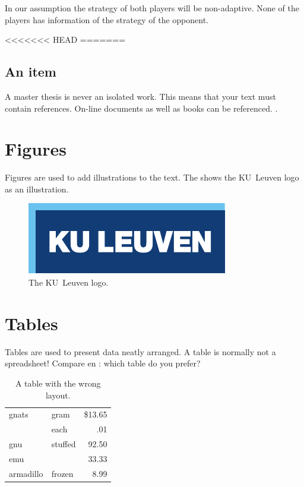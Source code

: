 In our assumption the strategy of both players will be non-adaptive. None of the players has information of the strategy of the opponent. 


<<<<<<< HEAD
=======
\subsection{An item}
A master thesis is never an isolated work. This means that your text must
contain references. On-line documents\cite{FlipThem} as well as
books\cite{DefendingAgainstUnknownEnemy} can be referenced. \cite{Craig2005}.

\section{Figures}
Figures are used to add illustrations to the text. The  shows
the KU~Leuven logo as an illustration.
\begin{figure}
  \centering
  \includegraphics{logokul}
  \caption{The KU~Leuven logo.}
  \label{fig:logo}
\end{figure}

\section{Tables}
Tables are used to present data neatly arranged. A table is normally
not a spreadsheet! Compare  en : which table do
you prefer?

\begin{table}
  \centering
  \begin{tabular}{||l|lr||} \hline
    gnats     & gram      & \$13.65 \\ \cline{2-3}
              & each      & .01 \\ \hline
    gnu       & stuffed   & 92.50 \\ \cline{1-1} \cline{3-3}
    emu       &           & 33.33 \\ \hline
    armadillo & frozen    & 8.99 \\ \hline
  \end{tabular}
  \caption{A table with the wrong layout.}
  \label{tab:wrong}
\end{table}

